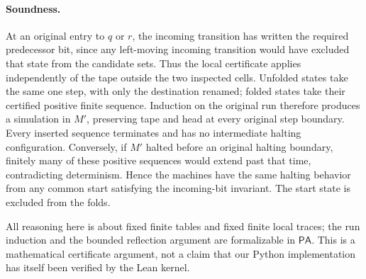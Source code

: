 \paragraph{Soundness.}
At an original entry to $q$ or $r$, the incoming transition has written the
required predecessor bit, since any left-moving incoming transition would
have excluded that state from the candidate sets.  Thus the local certificate
applies independently of the tape outside the two inspected cells.  Unfolded
states take the same one step, with only the destination renamed; folded
states take their certified positive finite sequence.  Induction on the
original run therefore produces a simulation in $M'$, preserving tape and
head at every original step boundary.  Every inserted sequence terminates
and has no intermediate halting configuration.  Conversely, if $M'$ halted
before an original halting boundary, finitely many of these positive
sequences would extend past that time, contradicting determinism.  Hence the
machines have the same halting behavior from any common start satisfying the
incoming-bit invariant.  The start state is excluded from the folds.

All reasoning here is about fixed finite tables and fixed finite local traces;
the run induction and the bounded reflection argument are formalizable in
$\mathsf{PA}$.  This is a mathematical certificate argument, not a claim that
our Python implementation has itself been verified by the Lean kernel.

